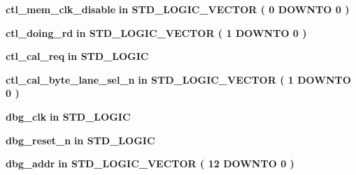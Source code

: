 \begin{DoxyCompactItemize}
\item 
{\bf ctl\+\_\+mem\+\_\+clk\+\_\+disable}  {\bfseries {\bfseries \textcolor{keywordflow}{in}\textcolor{vhdlchar}{ }}} {\bfseries \textcolor{comment}{S\+T\+D\+\_\+\+L\+O\+G\+I\+C\+\_\+\+V\+E\+C\+T\+OR}\textcolor{vhdlchar}{ }\textcolor{vhdlchar}{(}\textcolor{vhdlchar}{ }\textcolor{vhdlchar}{ } \textcolor{vhdldigit}{0} \textcolor{vhdlchar}{ }\textcolor{keywordflow}{D\+O\+W\+N\+TO}\textcolor{vhdlchar}{ }\textcolor{vhdlchar}{ } \textcolor{vhdldigit}{0} \textcolor{vhdlchar}{ }\textcolor{vhdlchar}{)}\textcolor{vhdlchar}{ }} 
\item 
{\bf ctl\+\_\+doing\+\_\+rd}  {\bfseries {\bfseries \textcolor{keywordflow}{in}\textcolor{vhdlchar}{ }}} {\bfseries \textcolor{comment}{S\+T\+D\+\_\+\+L\+O\+G\+I\+C\+\_\+\+V\+E\+C\+T\+OR}\textcolor{vhdlchar}{ }\textcolor{vhdlchar}{(}\textcolor{vhdlchar}{ }\textcolor{vhdlchar}{ } \textcolor{vhdldigit}{1} \textcolor{vhdlchar}{ }\textcolor{keywordflow}{D\+O\+W\+N\+TO}\textcolor{vhdlchar}{ }\textcolor{vhdlchar}{ } \textcolor{vhdldigit}{0} \textcolor{vhdlchar}{ }\textcolor{vhdlchar}{)}\textcolor{vhdlchar}{ }} 
\item 
{\bf ctl\+\_\+cal\+\_\+req}  {\bfseries {\bfseries \textcolor{keywordflow}{in}\textcolor{vhdlchar}{ }}} {\bfseries \textcolor{comment}{S\+T\+D\+\_\+\+L\+O\+G\+IC}\textcolor{vhdlchar}{ }} 
\item 
{\bf ctl\+\_\+cal\+\_\+byte\+\_\+lane\+\_\+sel\+\_\+n}  {\bfseries {\bfseries \textcolor{keywordflow}{in}\textcolor{vhdlchar}{ }}} {\bfseries \textcolor{comment}{S\+T\+D\+\_\+\+L\+O\+G\+I\+C\+\_\+\+V\+E\+C\+T\+OR}\textcolor{vhdlchar}{ }\textcolor{vhdlchar}{(}\textcolor{vhdlchar}{ }\textcolor{vhdlchar}{ } \textcolor{vhdldigit}{1} \textcolor{vhdlchar}{ }\textcolor{keywordflow}{D\+O\+W\+N\+TO}\textcolor{vhdlchar}{ }\textcolor{vhdlchar}{ } \textcolor{vhdldigit}{0} \textcolor{vhdlchar}{ }\textcolor{vhdlchar}{)}\textcolor{vhdlchar}{ }} 
\item 
{\bf dbg\+\_\+clk}  {\bfseries {\bfseries \textcolor{keywordflow}{in}\textcolor{vhdlchar}{ }}} {\bfseries \textcolor{comment}{S\+T\+D\+\_\+\+L\+O\+G\+IC}\textcolor{vhdlchar}{ }} 
\item 
{\bf dbg\+\_\+reset\+\_\+n}  {\bfseries {\bfseries \textcolor{keywordflow}{in}\textcolor{vhdlchar}{ }}} {\bfseries \textcolor{comment}{S\+T\+D\+\_\+\+L\+O\+G\+IC}\textcolor{vhdlchar}{ }} 
\item 
{\bf dbg\+\_\+addr}  {\bfseries {\bfseries \textcolor{keywordflow}{in}\textcolor{vhdlchar}{ }}} {\bfseries \textcolor{comment}{S\+T\+D\+\_\+\+L\+O\+G\+I\+C\+\_\+\+V\+E\+C\+T\+OR}\textcolor{vhdlchar}{ }\textcolor{vhdlchar}{(}\textcolor{vhdlchar}{ }\textcolor{vhdlchar}{ } \textcolor{vhdldigit}{12} \textcolor{vhdlchar}{ }\textcolor{keywordflow}{D\+O\+W\+N\+TO}\textcolor{vhdlchar}{ }\textcolor{vhdlchar}{ } \textcolor{vhdldigit}{0} \textcolor{vhdlchar}{ }\textcolor{vhdlchar}{)}\textcolor{vhdlchar}{ }} 

\end{DoxyCompactItemize}
